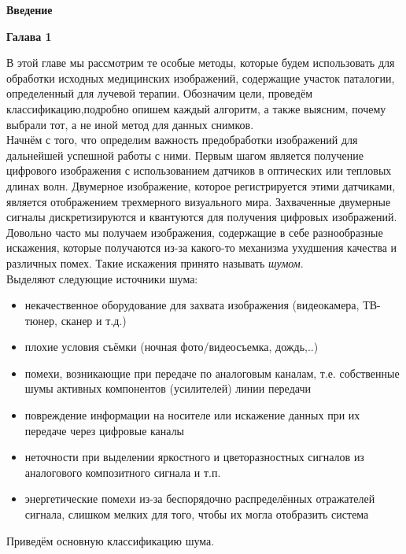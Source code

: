 \documentclass[12pt]{article}
\begin{document}
\begin{center}
	\textbf{Введение}
\end{center}
\begin{center}
	\textbf{Галава 1}
\end{center}
	
В этой главе мы рассмотрим те особые методы, которые будем использовать для обработки исходных медицинских изображений, содержащие участок паталогии, определенный для лучевой терапии. Обозначим цели, проведём классификацию,подробно опишем каждый алгоритм, а также выясним, почему выбрали тот, а не иной метод для данных снимков.\\

Начнём с того, что определим важность предобработки изображений для дальнейшей успешной работы с ними. 
Первым шагом является получение цифрового изображения с использованием датчиков в оптических или тепловых длинах волн. Двумерное изображение, которое регистрируется этими датчиками, является отображением трехмерного визуального мира. Захваченные двумерные сигналы дискретизируются и квантуются для получения цифровых изображений.
Довольно часто мы получаем изображения, содержащие в себе разнообразные искажения, которые получаются из-за какого-то механизма ухудшения качества и различных помех. Такие искажения принято называть \textit{шумом}.\\
Выделяют следующие источники шума:\\
\begin{itemize}
	\item некачественное оборудование для захвата изображения (видеокамера, ТВ-тюнер, сканер и т.д.)
	\item плохие условия съёмки (ночная фото/видеосъемка, дождь,..)
	\item помехи, возникающие при передаче по аналоговым каналам, т.е. собственные шумы активных компонентов (усилителей) линии передачи
	\item повреждение информации на носителе или искажение данных при их передаче через цифровые каналы
	\item неточности при выделении яркостного и цветоразностных сигналов из аналогового композитного сигнала и т.п.
	\item энергетические помехи из-за беспорядочно распределённых отражателей сигнала, слишком мелких для того, чтобы их могла отобразить система 
\end{itemize}
Приведём основную классификацию шума.\\
\end{document}
